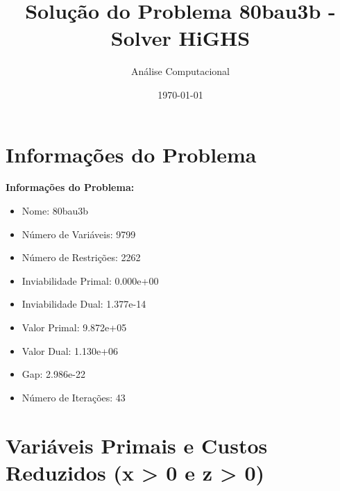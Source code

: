 \documentclass[12pt]{article}
\title{Solução do Problema 80bau3b - Solver HiGHS}
\author{Análise Computacional}
\date{\today}
\begin{document}
\maketitle

\section{Informações do Problema}

\textbf{Informações do Problema:}
\begin{itemize}
\item Nome: 80bau3b
\item Número de Variáveis: 9799
\item Número de Restrições: 2262
\item Inviabilidade Primal: 0.000e+00
\item Inviabilidade Dual: 1.377e-14
\item Valor Primal: 9.872e+05
\item Valor Dual: 1.130e+06
\item Gap: 2.986e-22
\item Número de Iterações: 43
\end{itemize}


\section{Variáveis Primais e Custos Reduzidos (x > 0 e z > 0)}
\end{document}
